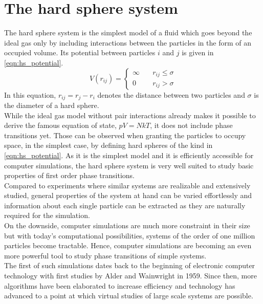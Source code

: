 \section{The hard sphere system}
\label{sec:HS_system}
The hard sphere system is the simplest model of a fluid which goes beyond the ideal gas only by including interactions between the particles in the form of an occupied volume. Its potential between particles $i$ and $j$ is given in \autoref{eqn:hs_potential}.
\begin{equation}
\label{eqn:hs_potential}
V(r_{ij})=%
\begin{cases}
\infty \quad & r_{ij} \le \sigma \\
0 \quad & r_{ij} > \sigma
\end{cases}
\end{equation}
In this equation, $r_{ij} = r_j - r_i$ denotes the distance between two particles and $\sigma$ is the diameter of a hard sphere.\\

While the ideal gas model without pair interactions already makes it possible to derive the famous equation of state, $pV=NkT$, it does not include phase transitions yet. Those can be observed when granting the particles to occupy space, in the simplest case, by defining hard spheres of the kind in \autoref{eqn:hs_potential}. As it is the simplest model and it is efficiently accessible for computer simulations, the hard sphere system is very well suited to study basic properties of first order phase transitions.\\ 

Compared to experiments where similar systems are realizable and extensively studied, general properties of the system at hand can be varied effortlessly and information about each single particle can be extracted as they are naturally required for the simulation.\\

On the downside, computer simulations are much more constraint in their size but with today's computational possibilities, systems of the order of one million particles become tractable. Hence, computer simulations are becoming an even more powerful tool to study phase transitions of simple systems.\\

The first of such simulations dates back to the beginning of electronic computer technology with first studies by Alder and Wainwright in 1959\cite{Alders59}. Since then, more algorithms have been elaborated to increase efficiency and technology has advanced to a point at which virtual studies of large scale systems are possible.


